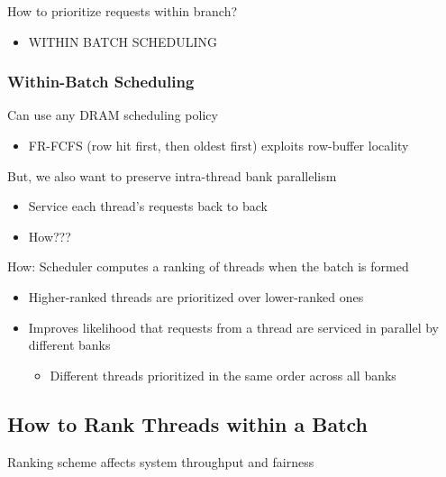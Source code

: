 \documentclass[]{article}
\providecommand{\tightlist}{%
  \setlength{\itemsep}{0pt}\setlength{\parskip}{0pt}}
\begin{document}
How to prioritize requests within branch?

\begin{itemize}
\tightlist
\item
  WITHIN BATCH SCHEDULING
\end{itemize}

\hypertarget{within-batch-scheduling}{%
\subsubsection{Within-Batch Scheduling}\label{within-batch-scheduling}}

Can use any DRAM scheduling policy

\begin{itemize}
\tightlist
\item
  FR-FCFS (row hit first, then oldest first) exploits row-buffer
  locality
\end{itemize}

But, we also want to preserve intra-thread bank parallelism

\begin{itemize}
\tightlist
\item
  Service each thread's requests back to back
\item
  How???
\end{itemize}

How: Scheduler computes a ranking of threads when the batch is formed

\begin{itemize}
\tightlist
\item
  Higher-ranked threads are prioritized over lower-ranked ones
\item
  Improves likelihood that requests from a thread are serviced in
  parallel by different banks

  \begin{itemize}
  \tightlist
  \item
    Different threads prioritized in the same order across all banks
  \end{itemize}
\end{itemize}

\hypertarget{how-to-rank-threads-within-a-batch}{%
\subsection{How to Rank Threads within a
Batch}\label{how-to-rank-threads-within-a-batch}}

Ranking scheme affects system throughput and fairness
\end{document}
